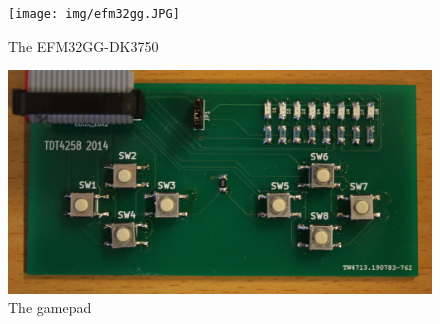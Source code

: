 \begin{figure}[h!]
    \texttt{[image: img/efm32gg.JPG]}
    \caption{The EFM32GG-DK3750 \label{img:efm32gg}}
\end{figure}
\begin{figure}[h!]
    \includegraphics[width=\linewidth]{img/gamepad.JPG}
    \caption{The gamepad \label{img:gamepad}}
\end{figure}

